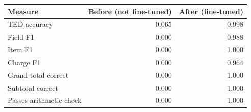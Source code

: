 \begin{tabular}{@{}lrr@{}}
\toprule
Measure & Before (not fine-tuned) & After (fine-tuned)\\
\midrule
TED accuracy & 0.065 & 0.998 \\
Field F1 & 0.000 & 0.988 \\
Item F1 & 0.000 & 1.000 \\
Charge F1 & 0.000 & 0.964 \\
Grand total correct & 0.000 & 1.000 \\
Subtotal correct & 0.000 & 1.000 \\
Passes arithmetic check & 0.000 & 1.000 \\
\bottomrule
\end{tabular}
